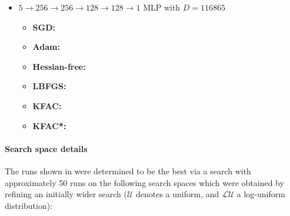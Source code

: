 \begin{itemize}
\item $5 \to 256 \to 256\to 128 \to 128 \to 1$ MLP with $D=\num{116865}$
  \begin{itemize}
    \def\pathToRuns{kfac_pinns_exp/exp29_heat4d_big/tex}
  \item \textbf{SGD:} 
  \item \textbf{Adam:} 
  \item \textbf{Hessian-free:} 
  \item \textbf{LBFGS:} 
  \item \textbf{KFAC:} 
  \item \textbf{KFAC*:} 
  \end{itemize}
\end{itemize}

\paragraph{Search space details} The runs shown in  were determined to be the best via a search with approximately 50 runs on the following search spaces which were obtained by refining an initially wider search ($\mathcal{U}$ denotes a uniform, and $\mathcal{LU}$ a log-uniform distribution):

